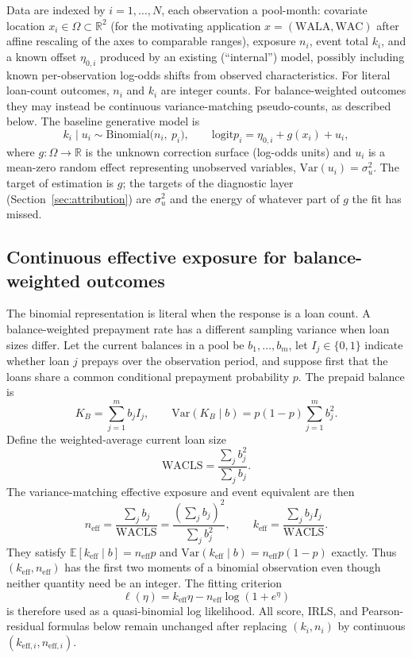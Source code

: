 \documentclass[11pt]{article}
\newcommand{\E}{\mathbb{E}}
\newcommand{\Var}{\mathrm{Var}}
\newcommand{\logit}{\mathrm{logit}}
\begin{document}
Data are indexed by $i=1,\dots,N$, each observation a pool-month:
covariate location $x_i\in\Omega\subset\mathbb{R}^2$ (for the motivating application
$x=(\text{WALA},\text{WAC})$ after affine rescaling of the axes to comparable ranges),
exposure $n_i$, event total $k_i$, and a known offset $\eta_{0,i}$ produced by an
existing (``internal'') model, possibly including known per-observation log-odds shifts
from observed characteristics. For literal loan-count outcomes, $n_i$ and $k_i$ are
integer counts. For balance-weighted outcomes they may instead be continuous
variance-matching pseudo-counts, as described below. The baseline generative model is
\begin{equation}\label{eq:model}
k_i \mid u_i \sim \mathrm{Binomial}\bigl(n_i,\ p_i\bigr),\qquad
\logit p_i = \eta_{0,i} + g(x_i) + u_i,
\end{equation}
where $g:\Omega\to\mathbb{R}$ is the unknown correction surface (log-odds units) and
$u_i$ is a mean-zero random effect representing unobserved variables,
$\Var(u_i)=\sigma_u^2$. The target of estimation is $g$; the targets of the diagnostic
layer (Section~\ref{sec:attribution}) are $\sigma_u^2$ and the energy of whatever part of $g$
the fit has missed.

\subsection{Continuous effective exposure for balance-weighted outcomes}
\label{sec:wacls}

The binomial representation is literal when the response is a loan count.  A
balance-weighted prepayment rate has a different sampling variance when loan
sizes differ.  Let the current balances in a pool be $b_1,\ldots,b_m$, let
$I_j\in\{0,1\}$ indicate whether loan $j$ prepays over the observation period,
and suppose first that the loans share a common conditional prepayment
probability $p$.  The prepaid balance is
\[
K_B=\sum_{j=1}^m b_j I_j,
\qquad
\Var(K_B\mid b)=p(1-p)\sum_{j=1}^m b_j^2.
\]
Define the weighted-average current loan size
\[
\mathrm{WACLS}=\frac{\sum_j b_j^2}{\sum_j b_j}.
\]
The variance-matching effective exposure and event equivalent are then
\begin{equation}\label{eq:wacls-counts}
 n_{\mathrm{eff}}
 =\frac{\sum_j b_j}{\mathrm{WACLS}}
 =\frac{(\sum_j b_j)^2}{\sum_j b_j^2},
 \qquad
 k_{\mathrm{eff}}
 =\frac{\sum_j b_j I_j}{\mathrm{WACLS}}.
\end{equation}
They satisfy $\E[k_{\mathrm{eff}}\mid b]=n_{\mathrm{eff}}p$ and
$\Var(k_{\mathrm{eff}}\mid b)=n_{\mathrm{eff}}p(1-p)$ exactly.  Thus
$(k_{\mathrm{eff}},n_{\mathrm{eff}})$ has the first two moments of a binomial
observation even though neither quantity need be an integer.  The fitting
criterion
\[
\ell(\eta)=k_{\mathrm{eff}}\eta-n_{\mathrm{eff}}\log(1+e^\eta)
\]
is therefore used as a quasi-binomial log likelihood.  All score, IRLS, and
Pearson-residual formulas below remain unchanged after replacing $(k_i,n_i)$
by continuous $(k_{\mathrm{eff},i},n_{\mathrm{eff},i})$.
\end{document}
